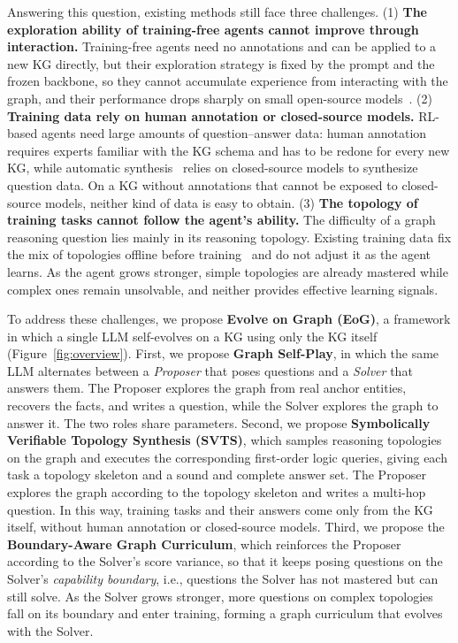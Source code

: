 Answering this question, existing methods still face three challenges. (1) \textbf{The exploration ability of training-free agents cannot improve through interaction.} Training-free agents need no annotations and can be applied to a new KG directly, but their exploration strategy is fixed by the prompt and the frozen backbone, so they cannot accumulate experience from interacting with the graph, and their performance drops sharply on small open-source models~\citep{SLMExploration,RPO-RAG}. (2) \textbf{Training data rely on human annotation or closed-source models.} RL-based agents need large amounts of question--answer data: human annotation~\citep{webqsp,cwq,grailqa,DBLP:conf/nips/ZhangJCCEWWZPWM25,EC-spLLM} requires experts familiar with the KG schema and has to be redone for every new KG, while automatic synthesis~\citep{GraphWalker,GRAIL,GraphScout} relies on closed-source models to synthesize question data. On a KG without annotations that cannot be exposed to closed-source models, neither kind of data is easy to obtain. (3) \textbf{The topology of training tasks cannot follow the agent's ability.} The difficulty of a graph reasoning question lies mainly in its reasoning topology. Existing training data fix the mix of topologies offline before training~\citep{GraphDancer,KnowCoder-A1} and do not adjust it as the agent learns. As the agent grows stronger, simple topologies are already mastered while complex ones remain unsolvable, and neither provides effective learning signals.

To address these challenges, we propose \textbf{Evolve on Graph (EoG)}, a framework in which a single LLM self-evolves on a KG using only the KG itself (Figure~\ref{fig:overview}). First, we propose \textbf{Graph Self-Play}, in which the same LLM alternates between a \emph{Proposer} that poses questions and a \emph{Solver} that answers them. The Proposer explores the graph from real anchor entities, recovers the facts, and writes a question, while the Solver explores the graph to answer it. The two roles share parameters. Second, we propose \textbf{Symbolically Verifiable Topology Synthesis (SVTS)}, which samples reasoning topologies on the graph and executes the corresponding first-order logic queries, giving each task a topology skeleton and a sound and complete answer set. The Proposer explores the graph according to the topology skeleton and writes a multi-hop question. In this way, training tasks and their answers come only from the KG itself, without human annotation or closed-source models. Third, we propose the \textbf{Boundary-Aware Graph Curriculum}, which reinforces the Proposer according to the Solver's score variance, so that it keeps posing questions on the Solver's \emph{capability boundary}, i.e., questions the Solver has not mastered but can still solve. As the Solver grows stronger, more questions on complex topologies fall on its boundary and enter training, forming a graph curriculum that evolves with the Solver.

